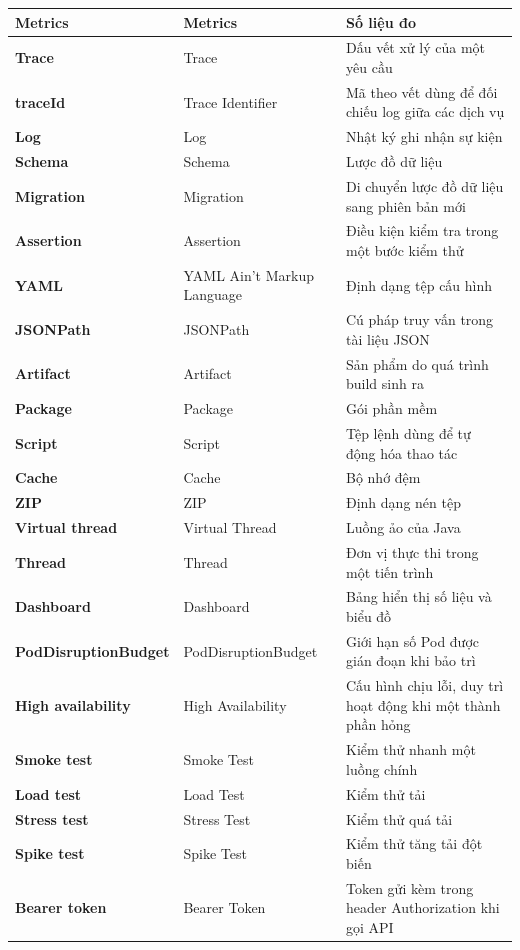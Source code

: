 \documentclass[../BTL.tex]{subfiles}
\begin{document}
\begin{longtable}{|p{3.2cm}|p{3.5cm}|p{7.1cm}|}
	\textbf{Metrics} & Metrics & Số liệu đo\\ \hline
	\textbf{Trace} & Trace & Dấu vết xử lý của một yêu cầu\\ \hline
	\textbf{traceId} & Trace Identifier & Mã theo vết dùng để đối chiếu log giữa các dịch vụ\\ \hline
	\textbf{Log} & Log & Nhật ký ghi nhận sự kiện\\ \hline
	\textbf{Schema} & Schema & Lược đồ dữ liệu\\ \hline
	\textbf{Migration} & Migration & Di chuyển lược đồ dữ liệu sang phiên bản mới\\ \hline
	\textbf{Assertion} & Assertion & Điều kiện kiểm tra trong một bước kiểm thử\\ \hline
	\textbf{YAML} & YAML Ain't Markup Language & Định dạng tệp cấu hình\\ \hline
	\textbf{JSONPath} & JSONPath & Cú pháp truy vấn trong tài liệu JSON\\ \hline
	\textbf{Artifact} & Artifact & Sản phẩm do quá trình build sinh ra\\ \hline
	\textbf{Package} & Package & Gói phần mềm\\ \hline
	\textbf{Script} & Script & Tệp lệnh dùng để tự động hóa thao tác\\ \hline
	\textbf{Cache} & Cache & Bộ nhớ đệm\\ \hline
	\textbf{ZIP} & ZIP & Định dạng nén tệp\\ \hline
	\textbf{Virtual thread} & Virtual Thread & Luồng ảo của Java\\ \hline
	\textbf{Thread} & Thread & Đơn vị thực thi trong một tiến trình\\ \hline
	\textbf{Dashboard} & Dashboard & Bảng hiển thị số liệu và biểu đồ\\ \hline
	\textbf{Pod\-Disruption\-Budget} & Pod\-Disruption\-Budget & Giới hạn số Pod được gián đoạn khi bảo trì\\ \hline
	\textbf{High availability} & High Availability & Cấu hình chịu lỗi, duy trì hoạt động khi một thành phần hỏng\\ \hline
	\textbf{Smoke test} & Smoke Test & Kiểm thử nhanh một luồng chính\\ \hline
	\textbf{Load test} & Load Test & Kiểm thử tải\\ \hline
	\textbf{Stress test} & Stress Test & Kiểm thử quá tải\\ \hline
	\textbf{Spike test} & Spike Test & Kiểm thử tăng tải đột biến\\ \hline
	\textbf{Bearer token} & Bearer Token & Token gửi kèm trong header Authorization khi gọi API\\ \hline

\end{longtable}
\end{document}
